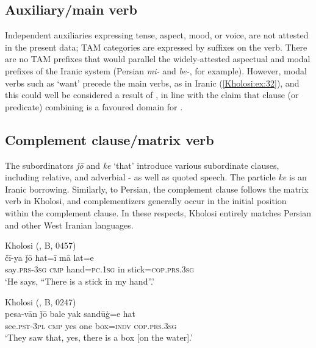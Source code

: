 \documentclass[output=paper,colorlinks,citecolor=brown]{langscibook}
\begin{document}
\subsection{Auxiliary/main verb}\label{Kholosi:ss:3.6}

Independent auxiliaries expressing tense, aspect, mood, or voice, are not attested in the present data; TAM categories are expressed by suffixes on the verb. There are no TAM prefixes that would parallel the widely-attested aspectual and modal prefixes of the Iranic system (Persian \textit{mi-} and \textit{be-}, for example). However, modal verbs such as `want' precede the main verbs, as in Iranic (\ref{Kholosi:ex:32}), and this could well be considered a result of , in line with the claim that clause (or predicate) combining is a favoured domain for  \citep{haig_linguistic_2001}.

\subsection{Complement clause/matrix verb}\label{Kholosi:ss:3.7}

The subordinators \textit{ǰō} and \textit{ke} `that' introduce various subordinate clauses, including relative,  and adverbial - as well as quoted speech. The particle \textit{ke} is an Iranic borrowing. Similarly, to Persian, the complement clause follows the matrix verb in Kholosi, and complementizers generally occur in the initial position within the complement clause. In these respects, Kholosi entirely matches Persian and other West Iranian languages.

\ea\label{Kholosi:ex:21}
Kholosi (\citealt{nourzaei_kholosi_2022}, B, 0457)\\
\gll čī-ya ǰō hat=ī mā lat=e \\
say\textsc{.prs-3sg} \textsc{cmp} hand\textsc{=pc.1sg} in stick\textsc{=cop.prs.3sg} \\
\glt `He says, ``There is a stick in my hand''.'
\z

\ea\label{Kholosi:ex:22}
Kholosi (\citealt{nourzaei_kholosi_2022}, B, 0247)\\
\gll pesa-vān ǰō bale yak sandūġ=e hat \\
see\textsc{.pst-3pl} \textsc{cmp} yes one box\textsc{=indv} \textsc{cop.prs.3sg} \\
\glt `They saw that, yes, there is a box [on the water].' 
\z
\end{document}
